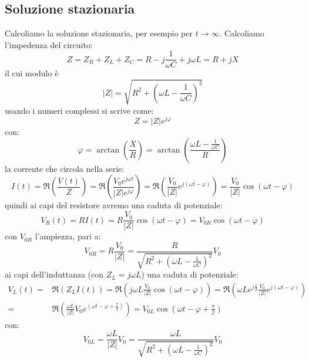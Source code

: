 \subsection{Soluzione stazionaria}
Calcoliamo la soluzione stazionaria, per esempio per $t\to\infty$. Calcoliamo l'impedenza del circuito:
\begin{equation}
Z=Z_R+Z_L+Z_C=R-j\frac{1}{\omega C}+j\omega L=R+j X
\end{equation}
il cui modulo è 
\begin{equation}
|Z|=\sqrt{R^2+\left(\omega L-\frac{1}{\omega C}\right)^2}
\end{equation}
usando i numeri complessi si scrive come:
\begin{equation}
Z=|Z|e^{j\varphi}
\end{equation}
con:
\begin{equation}
\varphi=\arctan\left(\frac{X}{R}\right)=\arctan\left(\frac{\omega L-\frac{1}{\omega C}}{R}\right)
\end{equation}
la corrente che circola nella serie:
\begin{equation}
I(t)=\Re\left({\frac{V(t)}{Z}}\right)=\Re\left({\frac{V_0e^{j\omega t}}{|Z|e^{j\varphi}}}\right)=\Re\left({\frac{V_0}{|Z|}e^{j(\omega t-\varphi)}}\right)=\frac{V_0}{|Z|}\cos(\omega t-\varphi)
\end{equation}
quindi ai capi del resistore avremo una caduta di potenziale:
\begin{equation}
V_R(t)=RI(t)=R\frac{V_0}{|Z|}\cos(\omega t-\varphi)=V_{0R}\cos(\omega t-\varphi)
\end{equation}
con $V_{0R}$ l'ampiezza, pari a:
\begin{equation}
V_{0R}=R\frac{V_0}{|Z|}=\frac{R}{\sqrt{R^2+\left(\omega L-\frac{1}{\omega C}\right)^2}}V_0
\end{equation}
ai capi dell'induttanza (con $Z_L=j\omega L$) una caduta di potenziale:
\begin{equation}
\begin{split}
V_L(t)=&\Re\left(Z_LI(t)\right)=\Re\left(j\omega L\frac{V_0}{|Z|}\cos(\omega t-\varphi)\right)=\Re\left(\omega Le^{j\frac{\pi}{2}}\frac{V_0}{|Z|}e^{j(\omega t-\varphi)}\right)\\
=&\Re\left(\frac{\omega L}{|Z|}V_0e^{\left(\omega t-\varphi+\frac{\pi}{2}\right)}\right)=V_{0L}\cos\left(\omega t-\varphi+\frac{\pi}{2}\right)
\end{split}
\end{equation}
con:
\begin{equation}
V_{0L}=\frac{\omega L}{|Z|}V_0=\frac{\omega L}{\sqrt{R^2+\left(\omega L-\frac{1}{\omega C}\right)^2}}V_0
\end{equation}
